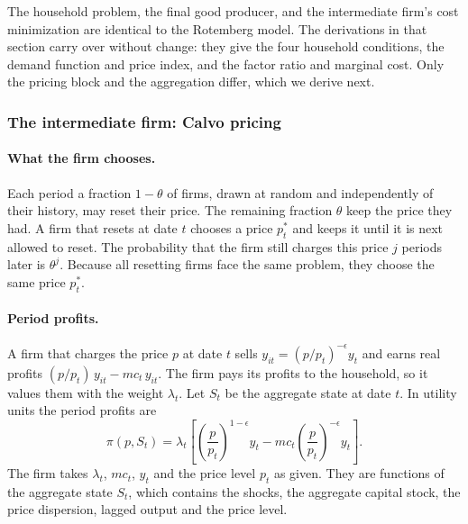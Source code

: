 \documentclass[11pt]{article}
\begin{document}
The household problem, the final good producer, and the intermediate firm's cost minimization are identical to the Rotemberg model. The derivations in that section carry over without change: they give the four household conditions, the demand function and price index, and the factor ratio and marginal cost. Only the pricing block and the aggregation differ, which we derive next.

\subsubsection{The intermediate firm: Calvo pricing}

\paragraph{What the firm chooses.} Each period a fraction $1-\theta$ of firms, drawn at random and independently of their history, may reset their price. The remaining fraction $\theta$ keep the price they had. A firm that resets at date $t$ chooses a price $p_t^{*}$ and keeps it until it is next allowed to reset. The probability that the firm still charges this price $j$ periods later is $\theta^j$. Because all resetting firms face the same problem, they choose the same price $p_t^{*}$.

\paragraph{Period profits.} A firm that charges the price $p$ at date $t$ sells $y_{it} = (p/p_t)^{-\epsilon} y_t$ and earns real profits $(p/p_t)\, y_{it} - mc_t\, y_{it}$. The firm pays its profits to the household, so it values them with the weight $\lambda_t$. Let $S_t$ be the aggregate state at date $t$. In utility units the period profits are
\begin{equation*}
\pi(p, S_t) = \lambda_t \left[ \left( \frac{p}{p_t} \right)^{1-\epsilon} y_t - mc_t \left( \frac{p}{p_t} \right)^{-\epsilon} y_t \right] .
\end{equation*}
The firm takes $\lambda_t$, $mc_t$, $y_t$ and the price level $p_t$ as given. They are functions of the aggregate state $S_t$, which contains the shocks, the aggregate capital stock, the price dispersion, lagged output and the price level.
\end{document}
